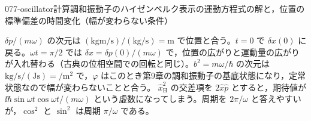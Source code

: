 \documentclass[uplatex,dvipdfmx,a4paper,11pt]{jsarticle}
\begin{document}
\begin{mondai}{077-oscillator}{計算}{調和振動子のハイゼンベルク表示の運動方程式の解と，位置の標準偏差の時間変化（幅が変わらない条件）}
\begin{tadashii}
\begin{ronten}
\end{ronten}
\kenzan $\delta p/(m\omega)$ の次元は $(\unit{\kilogram\metre\per\second})/(\unit{\kilogram\per\second})=\unit{\metre}$ で位置と合う。$t=0$ で $\delta x(0)$ に戻る。$\omega t=\pi/2$ では $\delta x=\delta p(0)/(m\omega)$ で，位置の広がりと運動量の広がりが入れ替わる（古典の位相空間での回転と同じ）。$b^{2}=m\omega/\hbar$ の次元は $\unit{\kilogram\per\second}/(\unit{\joule\second})=\unit{\per\metre\squared}$ で，$\varphi$ はこのとき第9章の調和振動子の基底状態になり，定常状態なので幅が変わらないことと合う。
\tsumazuki $\hat{x}_{\mathrm{H}}^{2}$ の交差項を $2\hat{x}\hat{p}$ とすると，期待値が $\ii\hbar\sin\omega t\cos\omega t/(m\omega)$ という虚数になってしまう。周期を $2\pi/\omega$ と答えやすいが，$\cos^{2}$ と $\sin^{2}$ は周期 $\pi/\omega$ である。
\end{tadashii}
\end{mondai}
\end{document}
